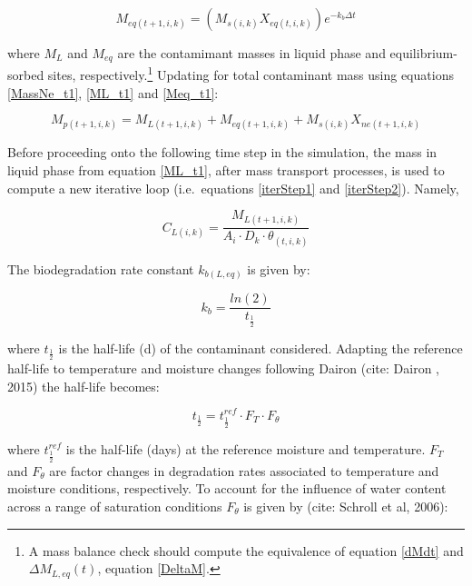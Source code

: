 \documentclass[]{article}
\let\rmarkdownfootnote\footnote%
\def\footnote{\protect\rmarkdownfootnote}
\begin{document}
\begin{equation}
M_{eq(t+1,i,k)} = (M_{s(i,k)}X_{eq(t,i,k)})e^{-k_{b} \Delta t}
\label{eq:Meq_t1}
\end{equation}

where \(M_{L}\) and \(M_{eq}\) are the contamimant masses in liquid
phase and equilibrium-sorbed sites,
respectively.\footnote{A mass balance check should compute the equivalence of equation \eqref{dMdt} and $\Delta M_{L,eq}(t)$, equation \eqref{DeltaM}.}
Updating for total contaminant mass using equations \eqref{MassNe_t1},
\eqref{ML_t1} and \eqref{Meq_t1}:

\begin{equation}
M_{p(t+1,i,k)} = M_{L(t+1,i,k)} + M_{eq(t+1,i,k)} + M_{s(i,k)}X_{ne(t+1,i,k)}
\label{eq:totmass_t1}
\end{equation}

Before proceeding onto the following time step in the simulation, the
mass in liquid phase from equation \eqref{ML_t1}, after mass transport
processes, is used to compute a new iterative loop (i.e.~equations
\eqref{iterStep1} and \eqref{iterStep2}). Namely,

\begin{equation}
C_{L(i,k)} = \frac{M_{L(t+1,i,k)}}{A_i \cdot D_k \cdot \theta_{(t,i,k)}} 
\label{eq:C_Lnew}
\end{equation}

The biodegradation rate constant \(k_{b(L,eq)}\) is given by:

\begin{equation}
k_b = \frac{ln(2)}{t_\frac{1}{2}} 
\label{eq:k_b}
\end{equation}

where \(t_\frac{1}{2}\) is the half-life (d) of the contaminant
considered. Adapting the reference half-life to temperature and moisture
changes following Dairon (cite: Dairon , 2015) the half-life becomes:

\begin{equation}
t_\frac{1}{2}=t_\frac{1}{2}^{ref}\cdot F_T \cdot F_\theta
\label{eq:DT50} 
\end{equation}

where \(t_\frac{1}{2}^{ref}\) is the half-life (days) at the reference
moisture and temperature. \(F_T\) and \(F_\theta\) are factor changes in
degradation rates associated to temperature and moisture conditions,
respectively. To account for the influence of water content across a
range of saturation conditions \(F_\theta\) is given by (cite: Schroll
et al, 2006):
\end{document}
